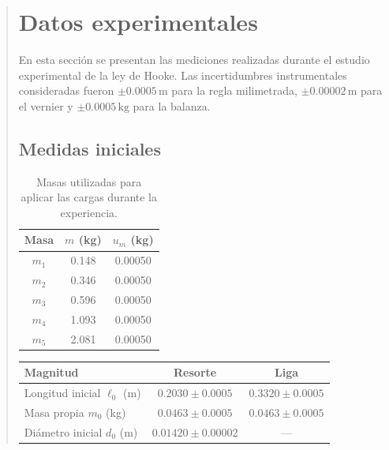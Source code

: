 \documentclass[11pt,a4paper]{article}
\begin{document}
\begin{quote}
\newpage
\section{Datos experimentales}

En esta sección se presentan las mediciones realizadas durante
el estudio experimental de la ley de Hooke. Las incertidumbres instrumentales consideradas fueron
$\pm 0.0005\,\mathrm{m}$ para la regla milimetrada,
$\pm 0.00002\,\mathrm{m}$ para el vernier y
$\pm 0.0005\,\mathrm{kg}$ para la balanza.

\subsection{Medidas iniciales}
\begin{table}[H]
    \centering
    \small
    \renewcommand{\arraystretch}{1.15}
    \begin{tabular}{ccc}
        \toprule
        \textbf{Masa} &
        \textbf{$m$ (kg)} &
        \textbf{$u_m$ (kg)} \\
        \midrule
        $m_1$ & 0.148 & 0.00050 \\
        $m_2$ & 0.346 & 0.00050 \\
        $m_3$ & 0.596 & 0.00050 \\
        $m_4$ & 1.093 & 0.00050 \\
        $m_5$ & 2.081 & 0.00050 \\
        \bottomrule
    \end{tabular}
    \caption{Masas utilizadas para aplicar las cargas
    durante la experiencia.}
    \label{tab:masas_hooke}
\end{table}

\begin{table}[H]
    \centering
    \small
    \renewcommand{\arraystretch}{1.20}
    \setlength{\tabcolsep}{5pt}
    \begin{tabular}{lcc}
        \toprule
        \textbf{Magnitud} &
        \textbf{Resorte} &
        \textbf{Liga} \\
        \midrule
        Longitud inicial $\ell_0$ (m) &
        $0.2030 \pm 0.0005$ &
        $0.3320 \pm 0.0005$ \\

        Masa propia $m_0$ (kg) &
        $0.0463 \pm 0.0005$ &
        $0.0463 \pm 0.0005$ \\

        Diámetro inicial $d_0$ (m) &
        $0.01420 \pm 0.00002$ &
        --- \\


\end{tabular}
\end{table}
\end{quote}
\end{document}
